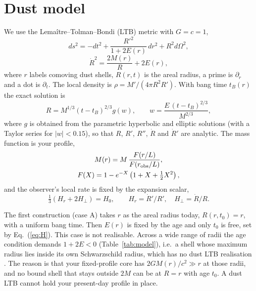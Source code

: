 \documentclass[10pt,twocolumn,letterpaper]{article}
\begin{document}
\section{Dust model}
We use the Lema\^itre--Tolman--Bondi (LTB) metric \cite{Bondi1947,Bolejko2011} with $G=c=1$,
\begin{equation}\label{eq:ltb}
ds^2=-dt^2+\frac{R'^2}{1+2E(r)}\,dr^2+R^2d\Omega^2,
\end{equation}
\begin{equation}\label{eq:fried}
\dot R^2=\frac{2M(r)}{R}+2E(r),
\end{equation}
where $r$ labels comoving dust shells, $R(r,t)$ is the areal radius, a prime is $\partial_r$ and a dot is $\partial_t$. The local density is $\rho=M'/(4\pi R^2R')$. With bang time $t_B(r)$ the exact solution is
\begin{equation}\label{eq:sol}
R=M^{1/3}(t-t_B)^{2/3}g(w),\qquad w=\frac{E\,(t-t_B)^{2/3}}{M^{2/3}},
\end{equation}
where $g$ is obtained from the parametric hyperbolic and elliptic solutions (with a Taylor series for $|w|<0.15$), so that $R$, $R'$, $R''$, $\dot R$ and $\dot R'$ are analytic. The mass function is your profile,
\begin{equation}\label{eq:M}
\begin{gathered}
M(r)=M\,\frac{F(r/L)}{F(r_{\rm obs}/L)},\\ F(X)=1-e^{-X}\left(1+X+\tfrac12X^2\right),
\end{gathered}
\end{equation}
and the observer's local rate is fixed by the expansion scalar,
\begin{equation}\label{eq:H}
\tfrac13\left(H_r+2H_\perp\right)=H_0,\qquad H_r=\dot R'/R',\quad H_\perp=\dot R/R.
\end{equation}

The first construction (case A) takes $r$ as the areal radius today, $R(r,t_0)=r$, with a uniform bang time. Then $E(r)$ is fixed by the age and only $t_0$ is free, set by Eq.~(\ref{eq:H}). This case is not realisable. Across a wide range of radii the age condition demands $1+2E<0$ (Table~\ref{tab:model}), i.e.\ a shell whose maximum radius lies inside its own Schwarzschild radius, which has no dust LTB realisation \cite{Hellaby1985}. The reason is that your fixed-profile core has $2GM(r)/c^2\gg r$ at those radii, and no bound shell that stays outside $2M$ can be at $R=r$ with age $t_0$. A dust LTB cannot hold your present-day profile in place.
\end{document}
